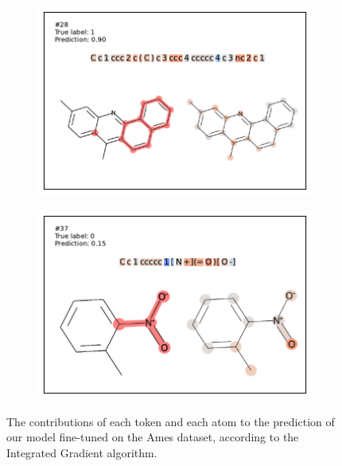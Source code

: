 \documentclass{article} %
\begin{document}
\begin{figure}[h]
\begin{subfigure}[b]{0.35\textwidth}
      \includegraphics[width=\textwidth]{figures/ames/ames28.pdf} 
    \end{subfigure}\begin{subfigure}[b]{0.35\textwidth} 
      \centering 
      \includegraphics[width=\textwidth]{figures/ames/ames37.pdf} 
    \end{subfigure}
    \caption{The contributions of each token and each atom to the prediction of our model fine-tuned on the Ames dataset, according to the Integrated Gradient algorithm.}
    \label{fig:captum-ames-main}
\end{figure}
\end{document}
